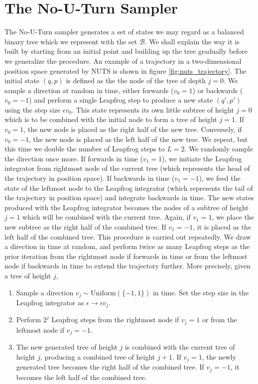 \section{The No-U-Turn Sampler}
The No-U-Turn sampler generates a set of states we may regard as a balanced binary tree which we represent with the set $\mathcal{B}$. 
We shall explain the way it is built by starting from an initial point and building up the tree gradually before we generalize the procedure. An example of a trajectory in a two-dimensional position space generated by NUTS is shown in figure \ref{fig:nuts_trajectory}. 
The initial state $(q, p)$ is defined as the the node of the tree of depth $j = 0$. We sample a direction at random in time, either forwards ($v_0 = 1$) or backwards ($v_0 = -1$) and perform a single Leapfrog step to produce a new state $(q', p')$ using the step size $\epsilon v_0$. This state represents its own little subtree of height $j = 0$ which is to be combined with the initial node to form a tree of height $j = 1$. If $v_0 = 1$, the new node is placed as the right half of the new tree. Conversely, if $v_0 = -1$, the new node is placed as the left half of the new tree. We repeat, but this time we double the number of Leapfrog steps to $L = 2$. We randomly sample the direction once more. If forwards in time ($v_1 = 1$), we initiate the Leapfrog integrator from rightmost node of the current tree (which represents the head of the trajectory in position space). If backwards in time ($v_1 = -1$), we feed the state of the leftmost node to the Leapfrog integrator (which represents the tail of the trajectory in position space) and integrate backwards in time. The new states produced with the Leapfrog integrator becomes the nodes of a subtree of height $j = 1$ which will be combined with the current tree. Again, if $v_1 = 1$, we place the new subtree as the right half of the combined tree. If $v_1 = -1$, it is placed as the left half of the combined tree. 
This procedure is carried out repeatedly. We draw a direction in time at random, and perform twice as many Leapfrog steps as the prior iteration from the rightmost node if forwards in time or from the leftmost node if backwards in time to extend the trajectory further. More precisely, given a tree of height $j$, 
\begin{enumerate}
    \item Sample a direction $v_j \sim \text{Uniform}(\{-1, 1\})$ in time. Set the step size in the Leapfrog integrator as $\epsilon \to \epsilon v_j$.
    \item Perform $2^j$ Leapfrog steps from the rightmost node if $v_j = 1$ or from the leftmost node if $v_j = -1$.  
    \item The new generated tree of height $j$ is combined with the current tree of height $j$, producing a combined tree of height $j + 1$. If $v_j = 1$, the newly generated tree becomes the right half of the combined tree. If $v_j = -1$, it becomes the left half of the combined tree.
\end{enumerate}

